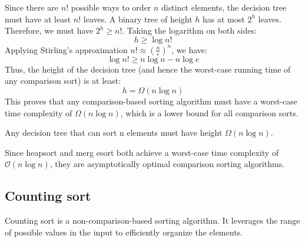 Since there are $n!$ possible ways to order $n$ distinct elements, the decision tree must have at least $n!$ leaves. 
A binary tree of height $h$ has at most $2^h$ leaves.
Therefore, we must have $2^h\geq n!$.
Taking the logarithm on both sides:
\[h\geq \log n!\]
Applying Stirling's approximation $n!\approx\left(\frac{n}{e}\right)^n$, we have:
\[\log n!\geq n\log n-n\log e\]
Thus, the height of the decision tree (and hence the worst-case running time of any comparison sort) is at least:
\[h=\Omega(n\log n)\]
This proves that any comparison-based sorting algorithm must have a worst-case time complexity of $\Omega(n\log n)$, which is a lower bound for all comparison sorts.
\begin{theorem}
    Any decision tree that can sort n elements must have height $\Omega(n \log n)$.
\end{theorem}
\begin{corollary}
    Since heapsort and merg esort both achieve a worst-case time complexity of $\mathcal{O}(n\log n)$, they are asymptotically optimal comparison sorting algorithms.
\end{corollary}
































\subsection{Counting sort}
Counting sort is a non-comparison-based sorting algorithm. 
It leverages the range of possible values in the input to efficiently organize the elements.


